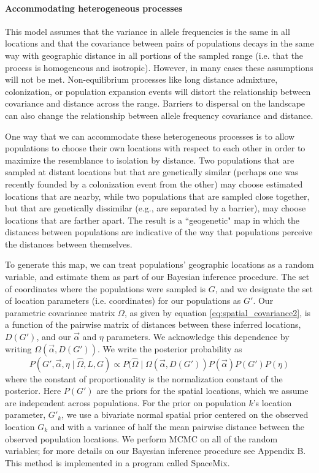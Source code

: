 \documentclass[12pt]{article}
\begin{document}
\paragraph{Accommodating heterogeneous processes}

This model assumes that the variance in allele frequencies is the same in all locations and that the covariance between pairs of populations decays in the same way with geographic distance in all portions of the sampled range (i.e. that the process is homogeneous and isotropic). However, in many cases these assumptions will not be met. Non-equilibrium processes like long distance admixture, colonization, or population expansion events will  distort the relationship between covariance and distance across the range.  Barriers to dispersal on the landscape can also change the relationship between allele frequency covariance and distance.

One way that we can accommodate these heterogeneous processes is to allow populations to choose their own locations with respect to each other in order to maximize the resemblance to isolation by distance. Two populations that are sampled at distant locations but that are genetically similar (perhaps one was recently founded by a colonization event from the other) may choose estimated locations that are nearby, while two populations that are sampled close together, but that are genetically dissimilar (e.g., are separated by a barrier), may choose locations that are farther apart. The result is a ``geogenetic" map in which the distances between populations are indicative of the way that populations perceive the distances between themselves.

To generate this map, we can treat populations' geographic locations as a random variable, and estimate them as part of our Bayesian inference procedure.  The set of coordinates where the populations were sampled is $G$, and we designate the set of location parameters (i.e. coordinates) for our populations as $G'$. Our parametric covariance matrix $\Omega$, as given by equation \eqref{eq:spatial_covariance2}, is a function of the pairwise matrix of distances between these inferred locations, $D(G')$, and our $\vec{\alpha}$ and $\eta$ parameters.  We acknowledge this dependence by writing $\Omega(\vec{\alpha},{D}(G'))$.  We write the  posterior probability as 
\begin{equation}
\label{eq:cyol_prob}
P(G', \vec{\alpha}, \eta \mid \widehat{\Omega}, L,G) \propto  P(\widehat{\Omega}  \mid \Omega(\vec{\alpha},{D}(G') ) P(\vec{\alpha}) P(G') P(\eta) 
\end{equation}
where the constant of proportionality is the normalization constant of the posterior. Here $P(G') $ are the priors for the spatial locations, which we assume are independent across populations. For the prior on population $k$'s location parameter, $G'_k$, we use a bivariate normal spatial prior centered on the observed location $G_k$ and with a variance of half the mean pairwise distance between the observed population locations. We perform MCMC on all of the random variables; for more details on our Bayesian inference procedure see Appendix B. This method is implemented in a program called SpaceMix.
\end{document}

